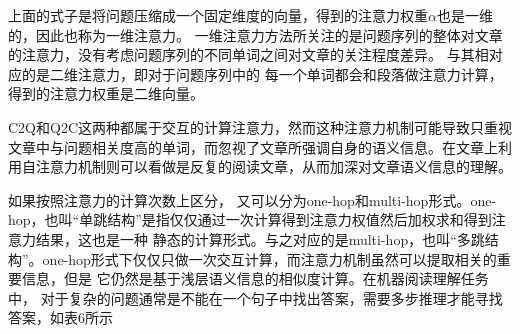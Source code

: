 上面的式子是将问题压缩成一个固定维度的向量，得到的注意力权重$\alpha$也是一维的，因此也称为一维注意力。
一维注意力方法所关注的是问题序列的整体对文章的注意力，没有考虑问题序列的不同单词之间对文章的关注程度差异。
与其相对应的是二维注意力，即对于问题序列中的
每一个单词都会和段落做注意力计算，得到的注意力权重是二维向量。

C2Q和Q2C这两种都属于交互的计算注意力，然而这种注意力机制可能导致只重视文章中与问题相关度高的单词，而忽视了文章所强调自身的语义信息。在文章上利用自注意力机制则可以看做是反复的阅读文章，从而加深对文章语义信息的理解。








如果按照注意力的计算次数上区分，
又可以分为one-hop和multi-hop形式。one-hop，也叫“单跳结构”是指仅仅通过一次计算得到注意力权值然后加权求和得到注意力结果，这也是一种
静态的计算形式。与之对应的是multi-hop，也叫“多跳结构”。one-hop形式下仅仅只做一次交互计算，而注意力机制虽然可以提取相关的重要信息，但是
它仍然是基于浅层语义信息的相似度计算。在机器阅读理解任务中，
对于复杂的问题通常是不能在一个句子中找出答案，需要多步推理才能寻找答案，如表6所示

